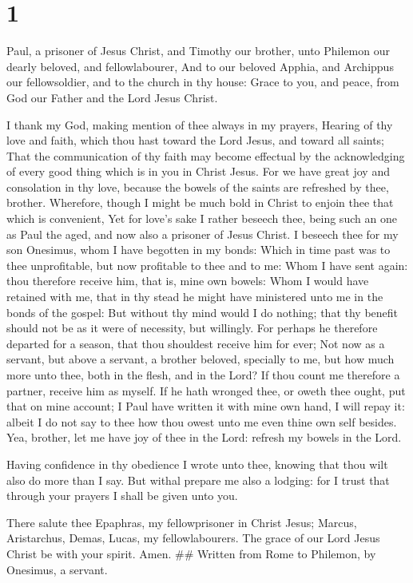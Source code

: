 \hypertarget{section}{%
\section{1}\label{section}}

 Paul, a prisoner of Jesus Christ, and Timothy our brother,
unto Philemon our dearly beloved, and fellowlabourer,  And
to our beloved Apphia, and Archippus our fellowsoldier, and to the
church in thy house:  Grace to you, and peace, from God our
Father and the Lord Jesus Christ.

 I thank my God, making mention of thee always in my
prayers,  Hearing of thy love and faith, which thou hast
toward the Lord Jesus, and toward all saints;  That the
communication of thy faith may become effectual by the acknowledging of
every good thing which is in you in Christ Jesus.  For we
have great joy and consolation in thy love, because the bowels of the
saints are refreshed by thee, brother.  Wherefore, though I
might be much bold in Christ to enjoin thee that which is convenient,
 Yet for love's sake I rather beseech thee, being such an
one as Paul the aged, and now also a prisoner of Jesus Christ.
 I beseech thee for my son Onesimus, whom I have begotten
in my bonds:  Which in time past was to thee unprofitable,
but now profitable to thee and to me:  Whom I have sent
again: thou therefore receive him, that is, mine own bowels:
 Whom I would have retained with me, that in thy stead he
might have ministered unto me in the bonds of the gospel: 
But without thy mind would I do nothing; that thy benefit should not be
as it were of necessity, but willingly.  For perhaps he
therefore departed for a season, that thou shouldest receive him for
ever;  Not now as a servant, but above a servant, a brother
beloved, specially to me, but how much more unto thee, both in the
flesh, and in the Lord?  If thou count me therefore a
partner, receive him as myself.  If he hath wronged thee,
or oweth thee ought, put that on mine account;  I Paul have
written it with mine own hand, I will repay it: albeit I do not say to
thee how thou owest unto me even thine own self besides. 
Yea, brother, let me have joy of thee in the Lord: refresh my bowels in
the Lord.

 Having confidence in thy obedience I wrote unto thee,
knowing that thou wilt also do more than I say.  But withal
prepare me also a lodging: for I trust that through your prayers I shall
be given unto you.

 There salute thee Epaphras, my fellowprisoner in Christ
Jesus;  Marcus, Aristarchus, Demas, Lucas, my
fellowlabourers.  The grace of our Lord Jesus Christ be
with your spirit. Amen. \#\# Written from Rome to Philemon, by Onesimus,
a servant.
